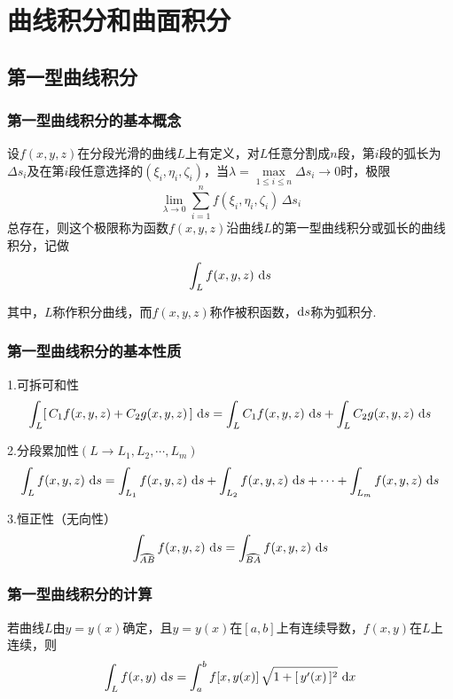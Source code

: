 \thispagestyle{empty}
\chapter{曲线积分和曲面积分}
\section{第一型曲线积分}
\subsection{第一型曲线积分的基本概念}
\tdefination[第一型曲线积分的定义]
设$f(x,y,z)$在分段光滑的曲线$L$上有定义，对$L$任意分割成$n$段，第$i$段的弧长为$\Delta s_i$及在第$i$段任意选择的$(\xi_i,\eta_i,\zeta_i)$，当$\lambda = \max\limits_{1 \le i \le n} {\Delta s_i}\rightarrow 0$时，极限
\begin{equation}
	\lim_{\lambda \rightarrow 0} \sum^{n}_{i=1} f(\xi_i,\eta_i,\zeta_i)\,\Delta s_i
\end{equation}
总存在，则这个极限称为函数$f(x,y,z)$沿曲线$L$的第一型曲线积分或弧长的曲线积分，记做
\begin{equation}
	\int_{L}f(x,y,z)\,\,{\rm{d}} s
\end{equation}
\par 其中，$L$称作积分曲线，而$f(x,y,z)$称作被积函数，${\rm{d}} s$称为弧积分.

\subsection{第一型曲线积分的基本性质}
\ttheorem[第一型曲线积分的三个基本性质]
1.可拆可和性
\begin{equation}
	\int_{L}[\,C_1f(x,y,z)+C_2g(x,y,z)\,]\,\,{\rm{d}} s =\int_{L}C_1f(x,y,z)\,\,{\rm{d}} s + \int_{L}C_2g(x,y,z)\,\,{\rm{d}} s
\end{equation}

\par 2.分段累加性$(L\rightarrow L_1,L_2,\cdots,L_m)$
\begin{equation}
	\int_{L}f(x,y,z)\,\,{\rm{d}} s = \int_{L_1}f(x,y,z)\,\,{\rm{d}} s +\int_{L_2}f(x,y,z)\,\,{\rm{d}} s + \cdots +\int_{L_m}f(x,y,z)\,\,{\rm{d}} s
\end{equation}

\par 3.恒正性（无向性）
\begin{equation}
	\int_{\wideparen{AB}}f(x,y,z)\,\,\d s = \int_{\wideparen{BA}}f(x,y,z)\,\,\d s 
\end{equation}

\subsection{第一型曲线积分的计算}
\ttheorem[直角坐标下平面曲线的积分]
若曲线$L$由$y=y(x)$确定，且$y=y(x)$在$[a,b]$上有连续导数，$f(x,y)$在$L$上连续，则
\begin{equation}
	\int_{L}f(x,y)\,\,{\rm{d}} s =\int_{a}^{b}f[x,y(x)]\,\sqrt{1+[\,y'(x)\,]^2}\,\,{\rm{d}} x
\end{equation}

